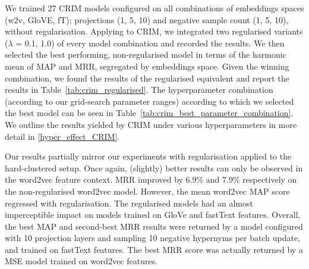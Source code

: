 We trained 27 CRIM models configured on all combinations of embeddings spaces (w2v, GloVE, fT); projections (1, 5, 10) and negative sample count (1, 5, 10), without regularisation.  Applying \citep{ustalov2017negative} to CRIM, we integrated two regularised variants ($\lambda$ = 0.1, 1.0) of every model combination and recorded the results.  We then selected the best performing, non-regularised model in terms of the harmonic mean of \ac{MAP} and \ac{MRR}, segregated by embeddings space.  Given the winning combination, we found the results of the regularised equivalent and report the results in Table~\ref{tab:crim_regularised}.  
The hyperparameter combination (according to our grid-search parameter ranges) according to which we selected the best model can be seen in Table~\ref{tab:crim_best_parameter_combination}.  We outline the results yielded by CRIM under various hyperparameters in more detail in \cref{hyper_effect_CRIM}.

Our results partially mirror our experiments with regularisation applied to the hard-clustered setup.  Once again, (slightly) better results can only be observed in the word2vec feature context.  \ac{MRR} improved by 6.9\% and 7.9\% respectively on the non-regularised word2vec model.  However, the mean word2vec \ac{MAP} score regressed with regularisation.  The regularised models had an almost imperceptible impact on models trained on GloVe and fastText features.  Overall, the best \ac{MAP} and second-best \ac{MRR} results were returned by a model configured with 10 projection layers and sampling 10 negative hypernyms per batch update, and trained on fastText features.  The best \ac{MRR} score was actually returned by a \ac{MSE} model trained on word2vec features.


